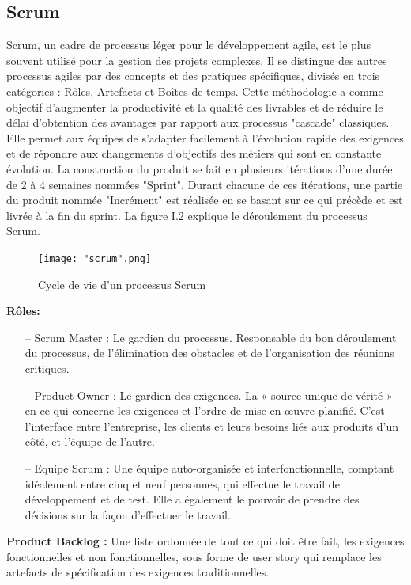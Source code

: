 \begin{spacing}{1.2}
\subsection{Scrum}
Scrum, un cadre de processus léger pour le développement agile, est le plus souvent utilisé pour la gestion des projets complexes. Il se distingue des autres processus agiles par des concepts et des pratiques spécifiques, divisés en trois catégories : Rôles, Artefacts et Boîtes de temps. Cette méthodologie a comme objectif d’augmenter la productivité et la qualité des livrables et de réduire le délai d'obtention des avantages par rapport aux processus "cascade" classiques. Elle permet aux équipes de s'adapter facilement à l’évolution rapide des exigences et de répondre aux changements d’objectifs des métiers qui sont en constante évolution.
La construction du produit se fait en plusieurs itérations d'une durée de 2 à 4 semaines nommées "Sprint". Durant chacune de ces itérations, une partie du produit nommée "Incrément" est réalisée en se basant sur ce qui précède et est livrée à la fin du sprint. La figure I.2 explique le déroulement du processus Scrum.
\begin{figure}[!ht]\centering
\texttt{[image: "scrum".png]}
\caption{Cycle de vie d'un processus Scrum \cite{scrum}}
\label{fig:fig1}
\end{figure}
\FloatBarrier
\textbf{Rôles:}
\begin{itemize}
\setlength\itemsep{0em}
    \item[--] Scrum Master : Le gardien du processus. Responsable du bon déroulement du processus, de l'élimination des obstacles et de l'organisation des réunions critiques.
    \item[--] Product Owner : Le gardien des exigences. La « source unique de vérité » en ce qui concerne les exigences et l'ordre de mise en œuvre planifié. C'est l'interface entre l'entreprise, les clients et leurs besoins liés aux produits d'un côté, et l'équipe de l'autre.
    \item[--] Equipe Scrum : Une équipe auto-organisée et interfonctionnelle, comptant idéalement entre cinq et neuf personnes, qui effectue le travail de développement et de test. Elle a également le pouvoir de prendre des décisions sur la façon d'effectuer le travail.
\end{itemize}

\textbf{Product Backlog : }
Une liste ordonnée de tout ce qui doit être fait, les exigences fonctionnelles et non fonctionnelles, sous forme de user story qui remplace les artefacts de spécification des exigences traditionnelles.


\end{spacing}
